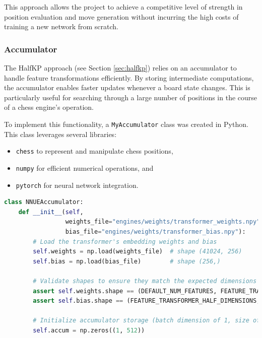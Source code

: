 \documentclass[12pt,a4paper]{article}
\begin{document}
This approach allows the project to achieve a competitive level of strength in position evaluation and move generation without incurring the high costs of training a new network from scratch.

\subsubsection*{Accumulator}
The HalfKP approach (see Section \ref{sec:halfkp}) relies on an accumulator to handle feature transformations efficiently. By storing intermediate computations, the accumulator enables faster updates whenever a board state changes. This is particularly useful for searching through a large number of positions in the course of a chess engine's operation.

To implement this functionality, a \texttt{MyAccumulator} class was created in Python. This class leverages several libraries:
\begin{itemize}
    \item \texttt{chess} to represent and manipulate chess positions,
    \item \texttt{numpy} for efficient numerical operations, and
    \item \texttt{pytorch} for neural network integration.
\end{itemize}

\begin{lstlisting}[language=Python, caption={Part 1: Initialization of NNUEAccumulator}, label={lst:accumulator}, basicstyle=\footnotesize\ttfamily,breaklines=true]
class NNUEAccumulator:
    def __init__(self, 
                 weights_file="engines/weights/transformer_weights.npy", 
                 bias_file="engines/weights/transformer_bias.npy"):
        # Load the transformer's embedding weights and bias
        self.weights = np.load(weights_file)  # shape (41024, 256)
        self.bias = np.load(bias_file)        # shape (256,)

        # Validate shapes to ensure they match the expected dimensions
        assert self.weights.shape == (DEFAULT_NUM_FEATURES, FEATURE_TRANSFORMER_HALF_DIMENSIONS)
        assert self.bias.shape == (FEATURE_TRANSFORMER_HALF_DIMENSIONS,)

        # Initialize accumulator storage (batch dimension of 1, size of 512)
        self.accum = np.zeros((1, 512))
\end{lstlisting}
\end{document}
